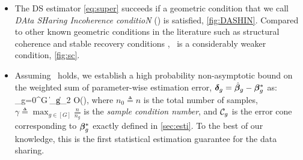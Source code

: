 \begin{itemize}[leftmargin = .4cm]
	\item The DS estimator \cref{eq:super} succeeds if a geometric condition that we call \emph{DAta SHaring Incoherence conditioN} (\ds) is satisfied, \cref{fig:DASHIN}. Compared to other known geometric conditions in the literature such as structural coherence \cite{guba16} and stable recovery conditions \cite{mctr13}, \ds\ is a considerably weaker condition, \cref{fig:sc}.
	\item Assuming \ds\ holds, we establish a high probability non-asymptotic bound on the weighted sum of parameter-wise estimation error, $\boldsymbol{\delta}_g = \hat{\boldsymbol{\beta}}_g - \boldsymbol{\beta}_g^*$ as:
	\beq
	\label{eq:errorsum}
	\sum_{g=0}^{G}   \|\ddelta_g\|_2 \leq  \gamma O\left(\right),
	\eeq
	where $n_0 \triangleq n$ is the total number of samples, $\gamma \triangleq \max_{g \in [G] } \frac{n}{n_g}$ is the \emph{sample condition number}, and $\cC_g$ is the error cone corresponding to $\boldsymbol{\beta}_g^*$ exactly defined in \cref{sec:esti}.
	To the best of our knowledge, this is the first statistical estimation guarantee for the data sharing.%
	

\end{itemize}
